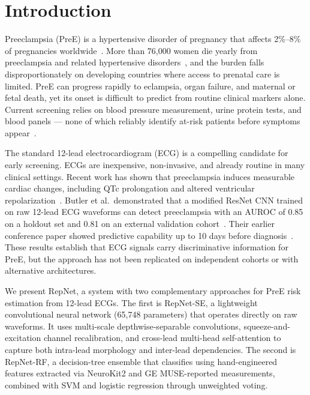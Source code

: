 \documentclass[sigconf,nonacm]{acmart}
\begin{document}
\section{Introduction}
\label{sec:intro}

Preeclampsia (PreE) is a hypertensive disorder of pregnancy that affects 2\%--8\% of pregnancies worldwide~\cite{ozcan_preeclampsia_2025}. More than 76,000 women die yearly from preeclampsia and related hypertensive disorders~\cite{butler_ai-based_2024}, and the burden falls disproportionately on developing countries where access to prenatal care is limited. PreE can progress rapidly to eclampsia, organ failure, and maternal or fetal death, yet its onset is difficult to predict from routine clinical markers alone. Current screening relies on blood pressure measurement, urine protein tests, and blood panels --- none of which reliably identify at-risk patients before symptoms appear~\cite{noauthor_preeclampsia_2018}.

The standard 12-lead electrocardiogram (ECG) is a compelling candidate for early screening. ECGs are inexpensive, non-invasive, and already routine in many clinical settings. Recent work has shown that preeclampsia induces measurable cardiac changes, including QTc prolongation and altered ventricular repolarization~\cite{raffaelli_pre-eclampsia_2014, angeli_novel_2015}. Butler et al.\ demonstrated that a modified ResNet CNN trained on raw 12-lead ECG waveforms can detect preeclampsia with an AUROC of 0.85 on a holdout set and 0.81 on an external validation cohort~\cite{butler_ai-based_2024}. Their earlier conference paper showed predictive capability up to 10 days before diagnosis~\cite{butler_electrocardiographic_2023}. These results establish that ECG signals carry discriminative information for PreE, but the approach has not been replicated on independent cohorts or with alternative architectures.

We present RepNet, a system with two complementary approaches for PreE risk estimation from 12-lead ECGs. The first is RepNet-SE, a lightweight convolutional neural network (65,748 parameters) that operates directly on raw waveforms. It uses multi-scale depthwise-separable convolutions, squeeze-and-excitation channel recalibration, and cross-lead multi-head self-attention to capture both intra-lead morphology and inter-lead dependencies. The second is RepNet-RF, a decision-tree ensemble that classifies using hand-engineered features extracted via NeuroKit2 and GE MUSE-reported measurements, combined with SVM and logistic regression through unweighted voting.
\end{document}
